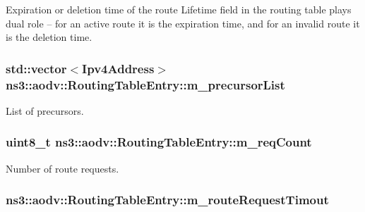 Expiration or deletion time of the route Lifetime field in the routing table plays dual role -- for an active route it is the expiration time, and for an invalid route it is the deletion time. 

\subsubsection[{\texorpdfstring{m\+\_\+precursor\+List}{m_precursorList}}]{\setlength{\rightskip}{0pt plus 5cm}std\+::vector$<${\bf Ipv4\+Address}$>$ ns3\+::aodv\+::\+Routing\+Table\+Entry\+::m\+\_\+precursor\+List\hspace{0.3cm}{\ttfamily [private]}}\hypertarget{classns3_1_1aodv_1_1RoutingTableEntry_a1bd922e14e533615b638fb848b700ec8}{}\label{classns3_1_1aodv_1_1RoutingTableEntry_a1bd922e14e533615b638fb848b700ec8}


List of precursors. 

\subsubsection[{\texorpdfstring{m\+\_\+req\+Count}{m_reqCount}}]{\setlength{\rightskip}{0pt plus 5cm}uint8\+\_\+t ns3\+::aodv\+::\+Routing\+Table\+Entry\+::m\+\_\+req\+Count\hspace{0.3cm}{\ttfamily [private]}}\hypertarget{classns3_1_1aodv_1_1RoutingTableEntry_af21ed22c0223a8c24731b9de3dd654e9}{}\label{classns3_1_1aodv_1_1RoutingTableEntry_af21ed22c0223a8c24731b9de3dd654e9}


Number of route requests. 

\subsubsection[{\texorpdfstring{m\+\_\+route\+Request\+Timout}{m_routeRequestTimout}}]{ ns3\+::aodv\+::\+Routing\+Table\+Entry\+::m\+\_\+route\+Request\+Timout\hspace{0.3cm}{\ttfamily [private]}}\hypertarget{classns3_1_1aodv_1_1RoutingTableEntry_a8089a53433b9852f1593e466e3e40b25}{}\label{classns3_1_1aodv_1_1RoutingTableEntry_a8089a53433b9852f1593e466e3e40b25}


